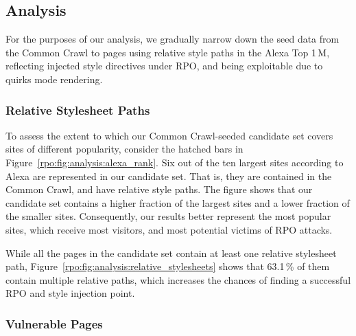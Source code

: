 \subsection{Analysis}
\label{rpo:sec:analysis}

% 

For the purposes of our analysis, we gradually narrow down the seed data from
the Common Crawl to pages using relative style paths in the Alexa Top 1\,M,
reflecting injected style directives under RPO, and being exploitable due to
quirks mode rendering.


\subsubsection{Relative Stylesheet Paths}
\label{rpo:sec:analysis:relative}



To assess the extent to which our Common Crawl-seeded candidate set covers sites
of different popularity, consider the hatched bars in
Figure~\ref{rpo:fig:analysis:alexa_rank}. Six out of the ten largest sites
according to Alexa are represented in our candidate set. That is, they are
contained in the Common Crawl, and have relative style paths. The figure shows
that our candidate set contains a higher fraction of the largest sites and a
lower fraction of the smaller sites. Consequently, our results better represent
the most popular sites, which receive most visitors, and most potential victims
of RPO attacks.

While all the pages in the candidate set contain at least one relative
stylesheet path, Figure~\ref{rpo:fig:analysis:relative_stylesheets} shows that
63.1\,\% of them contain multiple relative paths, which increases the chances of
finding a successful RPO and style injection point.

\subsubsection{Vulnerable Pages}
\label{rpo:sec:analysis:vulnerable}

